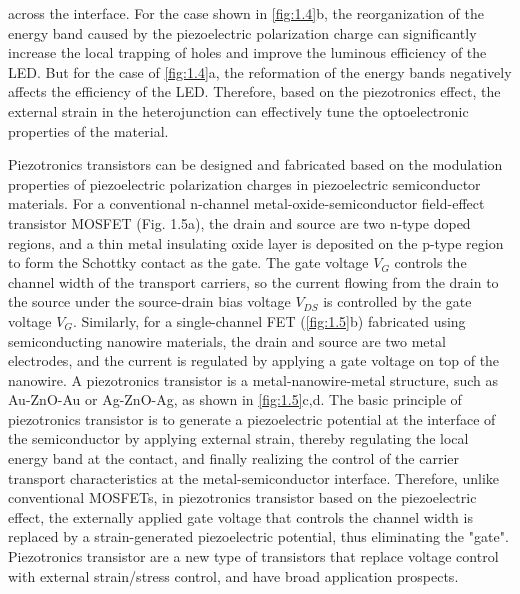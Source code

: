 \noindent across the  interface. For the case shown in \autoref{fig:1.4}b, the reorganization of the energy band  caused by the piezoelectric polarization charge  can significantly increase the local trapping of holes and improve the luminous efficiency of the LED. But for the case of \autoref{fig:1.4}a, the reformation of the energy bands  negatively affects the efficiency of the LED. Therefore, based on the piezotronics  effect, the external strain  in the heterojunction can effectively tune the optoelectronic properties of the material.

Piezotronics  transistors can be designed and fabricated based on the modulation  properties of piezoelectric polarization charges  in piezoelectric semiconductor materials. For a conventional  n-channel metal-oxide-semiconductor field-effect transistor MOSFET (Fig. 1.5a), the drain and source are two n-type doped regions, and a thin metal insulating oxide layer is deposited on the p-type region to form the Schottky contact  as the gate. The  gate voltage $V_{G}$ controls the channel  width of the transport carriers, so the current flowing from the drain to the source under the source-drain bias voltage $V_{DS}$ is controlled by the gate voltage $V_{G}$. Similarly, for a single-channel FET (\autoref{fig:1.5}b) fabricated using semiconducting nanowire materials, the drain and source are two metal electrodes, and the current is regulated by applying a gate voltage  on top of the nanowire. A piezotronics  transistor is a metal-nanowire-metal structure, such as Au-ZnO-Au or Ag-ZnO-Ag, as shown in \autoref{fig:1.5}c,d. The basic principle of piezotronics  transistor is to generate a piezoelectric potential  at the interface  of the semiconductor by applying external  strain, thereby regulating the local energy band  at the contact, and finally realizing the control of the carrier transport characteristics at the metal-semiconductor interface. Therefore, unlike conventional MOSFETs, in piezotronics  transistor based on the piezoelectric  effect, the externally applied gate voltage  that controls the channel  width is replaced by a  strain-generated piezoelectric  potential, thus eliminating the "gate". Piezotronics  transistor are a new type of transistors that replace voltage control with external  strain/stress control, and have broad application prospects.

